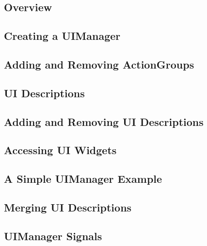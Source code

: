 	\subsection{Overview}
	\subsection{Creating a UIManager}
	\subsection{Adding and Removing ActionGroups}
	\subsection{UI Descriptions}
	\subsection{Adding and Removing UI Descriptions}
	\subsection{Accessing UI Widgets}
	\subsection{A Simple UIManager Example}
	\subsection{Merging UI Descriptions}
	\subsection{UIManager Signals}
